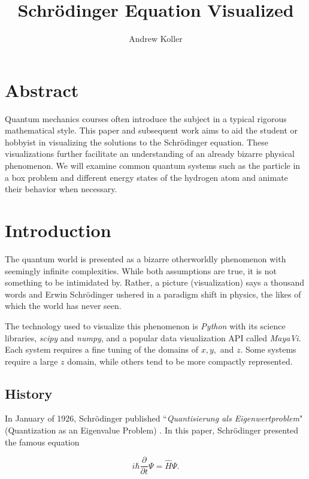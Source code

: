 \documentclass[11pt]{article}
\begin{document}
\title{Schrödinger Equation Visualized}
\author{Andrew Koller}
\maketitle

\section*{Abstract}
Quantum mechanics courses often introduce the subject in a typical rigorous mathematical style. This paper and subsequent work aims to aid the student or hobbyist in visualizing the solutions to the Schrödinger equation. These visualizations further facilitate an understanding of an already bizarre physical phenomenon. We will examine common quantum systems such as the particle in a box problem and different energy states of the hydrogen atom and animate their behavior when necessary. 

\section{Introduction}
The quantum world is presented as a bizarre otherworldly phenomenon with seemingly infinite complexities. While both assumptions are true, it is not something to be intimidated by. Rather, a picture (visualization) says a thousand words and Erwin Schrödinger ushered in a paradigm shift in physics, the likes of which the world has never seen.

The technology used to visualize this phenomenon is \textit{Python} with its science libraries, \textit{scipy} and \textit{numpy}, and a popular data visualization API called \textit{MayaVi}. Each system requires a fine tuning of the domains of $x, y,$ and $z$. Some systems require a large $z$ domain, while others tend to be more compactly represented. 

\subsection{History}

In January of 1926, Schrödinger published ``\textit{Quantisierung als Eigenwertproblem}" (Quantization as an Eigenvalue Problem) \cite{modernphysics}. In this paper, Schrödinger presented the famous equation 

\begin{equation}
i\hbar\frac{\partial}{\partial t}\Psi = \hat{H}\Psi.
\end{equation}
\end{document}
